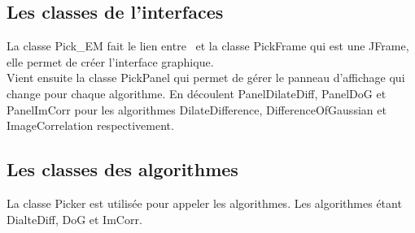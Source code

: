 \documentclass[11pt,a4paper]{report}
\begin{document}
\subsection{Les classes de l'interfaces}
La classe Pick\_EM fait le lien entre \imj ~et la classe PickFrame qui est une JFrame, elle permet de créer l'interface graphique.\\
Vient ensuite la classe PickPanel qui permet de gérer le panneau d'affichage qui change pour chaque algorithme. En découlent PanelDilateDiff, PanelDoG et PanelImCorr pour les algorithmes DilateDifference, DifferenceOfGaussian et ImageCorrelation respectivement.
\subsection{Les classes des algorithmes}
La classe Picker est utilisée pour appeler les algorithmes. Les algorithmes étant DialteDiff, DoG et ImCorr.
\end{document}

